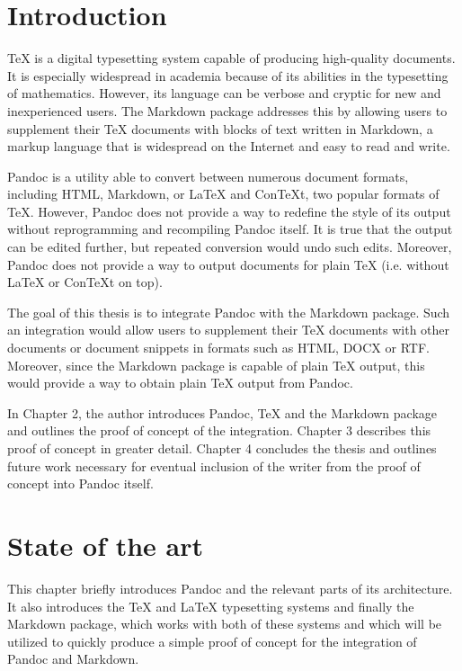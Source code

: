 \documentclass[
  digital,     %
  oneside,     %
  nosansbold,  %
  nocolorbold, %
  lof,         %
  nolot,       %
]{fithesis4}
\begin{document}

\chapter{Introduction}
\TeX{} is a digital typesetting system capable of producing high-quality documents. It is especially widespread in academia because of its abilities in the typesetting of mathematics. However, its language can be verbose and cryptic for new and inexperienced users. The Markdown package addresses this by allowing users to supplement their \TeX{} documents with blocks of text written in Markdown, a markup language that is widespread on the Internet and easy to read and write.

Pandoc is a utility able to convert between numerous document formats, including HTML, Markdown, or \LaTeX{} and Con\TeX{}t, two popular formats of \TeX{}. However, Pandoc does not provide a way to redefine the style of its output without reprogramming and recompiling Pandoc itself. It is true that the output can be edited further, but repeated conversion would undo such edits. Moreover, Pandoc does not provide a way to output documents for plain \TeX{} (i.e. without \LaTeX{} or Con\TeX{}t on top).

The goal of this thesis is to integrate Pandoc with the Markdown package. Such an integration would allow users to supplement their \TeX{} documents with other documents or document snippets in formats such as HTML, DOCX or RTF. Moreover, since the Markdown package is capable of plain \TeX{} output, this would provide a way to obtain plain \TeX{} output from Pandoc.

In Chapter 2, the author introduces Pandoc, \TeX{} and the Markdown package and outlines the proof of concept of the integration. Chapter 3 describes this proof of concept in greater detail. Chapter 4 concludes the thesis and outlines future work necessary for eventual inclusion of the writer from the proof of concept into Pandoc itself.

\chapter{State of the art}
This chapter briefly introduces Pandoc and the relevant parts of its architecture. It also introduces the \TeX{} and \LaTeX{} typesetting systems and finally the Markdown package, which works with both of these systems and which will be utilized to quickly produce a simple proof of concept for the integration of Pandoc and Markdown.
\end{document}

